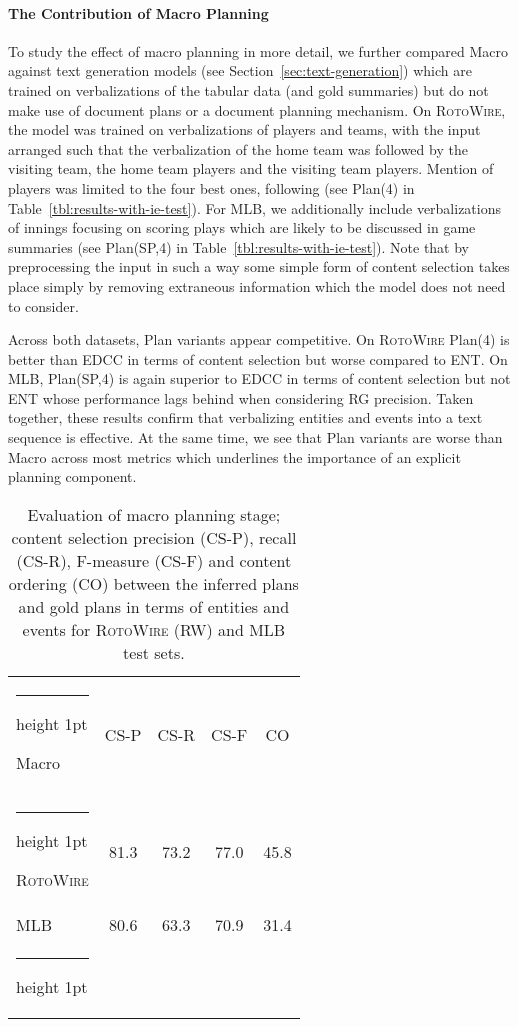 \documentclass[11pt,a4paper]{article}
\makeatletter
\newcommand{\thickhline}{\noalign {\ifnum 0=`}\fi \hrule height 1pt
    \futurelet \reserved@a \@xhline
}
\makeatother
\begin{document}
\paragraph{The Contribution of Macro Planning}
To study the effect of macro planning in more detail, we further
compared Macro against text generation models (see
Section~\ref{sec:text-generation}) which are trained on verbalizations
of the tabular data (and gold summaries) but do not make use of
document plans or a document planning mechanism.  On
\textsc{RotoWire}, the model was trained on verbalizations of players
and teams, with the input arranged such that the verbalization of the
home team was followed by the visiting team, the home team players and
the visiting team players. Mention of players was limited to the four
best ones, following \citet{saleh-etal-2019-naver} (see Plan(4) in
Table~\ref{tbl:results-with-ie-test}).  For MLB, we additionally
include verbalizations of innings focusing on scoring plays which are
likely to be discussed in game summaries (see Plan(SP,4) in
Table~\ref{tbl:results-with-ie-test}). Note that by preprocessing the
input in such a way some simple form of content selection takes place
simply by removing extraneous information which the model does not
need to consider. 


Across both datasets, Plan variants appear competitive. On
\textsc{RotoWire} Plan(4) is better than EDCC in terms of
content selection but worse compared to ENT. On MLB, Plan(SP,4) is
again superior to EDCC in terms of content selection but not ENT
whose performance lags behind when considering RG precision. Taken
together, these results confirm that verbalizing entities and events
into a text sequence is effective. At the same time, we see that
Plan variants are worse than Macro across most metrics which underlines
the importance of an explicit planning component.

\begin{table}[t]
\footnotesize
\centering
\begin{tabular}{ lcccc }\thickhline
 Macro  & CS-P & CS-R & CS-F & CO \\ \thickhline 
\textsc{RotoWire} & 81.3 & 73.2 & 77.0 & 45.8 \\  MLB & 80.6 & 63.3 & 70.9& 31.4 \\
\thickhline 
\end{tabular}
\caption{Evaluation of macro planning stage; 
content selection precision (CS-P), recall
(CS-R), F-measure (CS-F) and content ordering (CO) between the inferred
plans and gold plans in terms of entities and events for
  \textsc{RotoWire} (RW) and MLB test sets.}
\label{tbl:inf-plans-cs-co}
\end{table}
\end{document}
